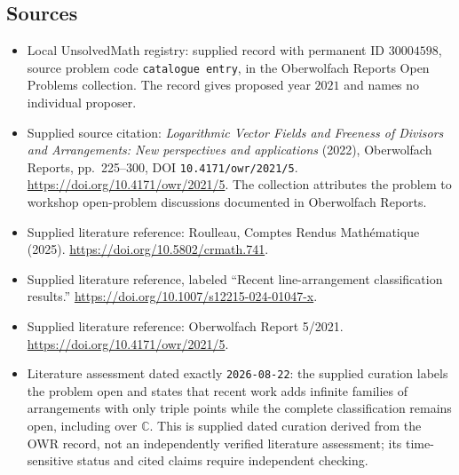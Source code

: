 \documentclass[11pt]{article}
\newcommand{\C}{\mathbb{C}}
\begin{document}
\subsection{Sources}
\begin{itemize}
\item Local UnsolvedMath registry: supplied record with permanent ID \(30004598\), source problem code \texttt{catalogue entry}, in the Oberwolfach Reports Open Problems collection. The record gives proposed year \(2021\) and names no individual proposer.
\item Supplied source citation: \emph{Logarithmic Vector Fields and Freeness of Divisors and Arrangements: New perspectives and applications} (2022), Oberwolfach Reports, pp.\ 225--300, DOI \texttt{10.4171/owr/2021/5}. \url{https://doi.org/10.4171/owr/2021/5}. The collection attributes the problem to workshop open-problem discussions documented in Oberwolfach Reports.
\item Supplied literature reference: Roulleau, Comptes Rendus Math\'ematique (2025). \url{https://doi.org/10.5802/crmath.741}.
\item Supplied literature reference, labeled ``Recent line-arrangement classification results.'' \url{https://doi.org/10.1007/s12215-024-01047-x}.
\item Supplied literature reference: Oberwolfach Report 5/2021. \url{https://doi.org/10.4171/owr/2021/5}.
\item Literature assessment dated exactly \texttt{2026-08-22}: the supplied curation labels the problem open and states that recent work adds infinite families of arrangements with only triple points while the complete classification remains open, including over \(\C\). This is supplied dated curation derived from the OWR record, not an independently verified literature assessment; its time-sensitive status and cited claims require independent checking.
\end{itemize}
\end{document}
